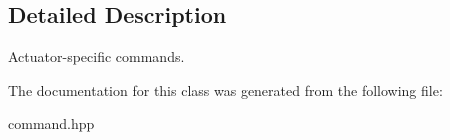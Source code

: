 \subsection{Detailed Description}
Actuator-\/specific commands. 

The documentation for this class was generated from the following file\+:\begin{DoxyCompactItemize}
\item 
command.\+hpp\end{DoxyCompactItemize}
